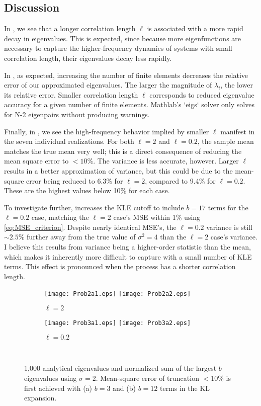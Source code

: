 \documentclass[11pt]{article}
\begin{document}
\subsection*{Discussion}

In , we see that a longer correlation length $\ell$ is associated with a more rapid decay in eigenvalues. This is expected, since because more eigenfunctions are necessary to capture the higher-frequency dynamics of systems with small correlation length, their eigenvalues decay less rapidly.

In , as expected, increasing the number of finite elements decreases the relative error of our approximated eigenvalues. The larger the magnitude of $\lambda_i$, the lower its relative error. Smaller correlation length $\ell$ corresponds to reduced eigenvalue accuracy for a given number of finite elements. Mathlab's `eigs` solver only solves for N-2 eigenpairs without producing warnings.

Finally, in , we see the high-frequency behavior implied by smaller $\ell$ manifest in the seven individual realizations. For both $\ell=2$ and $\ell=0.2$, the sample mean matches the true mean very well; this is a direct consequence of reducing the mean square error to $<10\%$. The variance is less accurate, however. Larger $\ell$ results in a better approximation of variance, but this could be due to the mean-square error being reduced to 6.3\% for $\ell=2$, compared to 9.4\% for $\ell=0.2$. These are the highest values below 10\% for each case.

To investigate further,  increases the KLE cutoff to include $b=17$ terms for the $\ell=0.2$ case, matching the $\ell=2$ case's MSE within 1\% using \eqref{eq:MSE_criterion}. Despite nearly identical MSE's, the $\ell=0.2$ variance is still $\sim2.5\%$ further away from the true value of $\sigma^2 = 4$ than the $\ell=2$ case's variance. I believe this results from variance being a higher-order statistic than the mean, which makes it inherently more difficult to capture with a small number of KLE terms. This effect is pronounced when the process has a shorter correlation length.

\begin{figure}[p]
\centering
\begin{subfigure}{0.49\textwidth}
\texttt{[image: Prob2a1.eps]}
\texttt{[image: Prob2a2.eps]}
\caption{$\ell=2$}
\end{subfigure}
\begin{subfigure}{0.49\textwidth}
\texttt{[image: Prob3a1.eps]}
\texttt{[image: Prob3a2.eps]}
\caption{$\ell=0.2$}
\end{subfigure}
\\[0.2cm]
\caption{1,000 analytical eigenvalues and normalized sum of the largest $b$ eigenvalues using $\sigma = 2$. Mean-square error of truncation $<10\%$ is first achieved with (a) $b=3$ and (b) $b=12$ terms in the KL expansion.}
\label{fig:analytical_eigs}
\end{figure}
\end{document}
